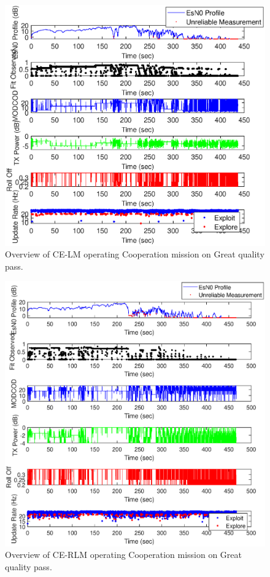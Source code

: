 \begin{figure}[ht]
\centering
\includegraphics[width=\textwidth]{figures/flight_results/coop_great_lm_overview.eps}
\caption{Overview of CE-LM operating Cooperation mission on Great quality pass.}
\label{fig:flight_lm_coop_great_overview}
\end{figure}
\begin{figure}[ht]
\centering
\includegraphics[width=\textwidth]{figures/flight_results/coop_great_rlm_overview.eps}
\caption{Overview of CE-RLM operating Cooperation mission on Great quality pass.}
\label{fig:flight_rlm_coop_great_overview}
\end{figure}
